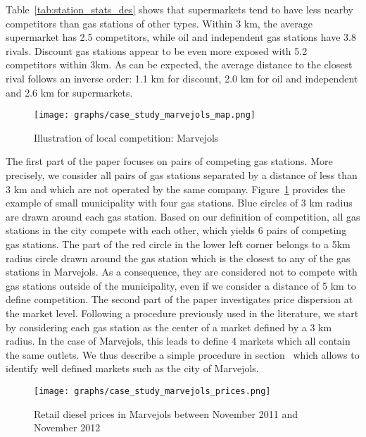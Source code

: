 \documentclass[english]{article}
\begin{document}
Table~\ref{tab:station_stats_des} shows that supermarkets tend to have less nearby competitors than gas stations of other types. Within 3 km, the average supermarket has 2.5 competitors, while oil and independent gas stations have 3.8 rivals. Discount gas stations appear to be even more exposed with 5.2 competitors within 3km. As can be expected, the average distance to the closest rival follows an inverse order: 1.1 km for discount, 2.0 km for oil and independent and 2.6 km for supermarkets.

\begin{figure}[htb!]
    \caption{Illustration of local competition: Marvejols}
	\centering
\texttt{[image: graphs/case\_study\_marvejols\_map.png]}
\label{fig:case_study_map}
\end{figure}

The first part of the paper focuses on pairs of competing gas stations. More precisely, we consider all pairs of gas stations separated by a distance of less than 3 km and which are not operated by the same company. Figure~\ref{fig:case_study_map} provides the example of small municipality with four gas stations. Blue circles of 3 km radius are drawn around each gas station. Based on our definition of competition, all gas stations in the city compete with each other, which yields 6 pairs of competing gas stations. The part of the red circle in the lower left corner belongs to a 5km radius circle drawn around the gas station which is the closest to any of the gas stations in Marvejols. As a consequence, they are considered not to compete with gas stations outside of the municipality, even if we consider a distance of 5 km to define competition. The second part of the paper investigates price dispersion at the market level. Following a procedure previously used in the literature, we start by considering each gas station as the center of a market defined by a 3 km radius. In the case of Marvejols, this leads to define 4 markets which all contain the same outlets. We thus describe a simple procedure in section~\label{sec:market_dispersion} which allows to identify well defined markets such as the city of Marvejols.

\begin{figure}%
    \caption{Retail diesel prices in Marvejols between November 2011 and November 2012}
	\centering
		\texttt{[image: graphs/case\_study\_marvejols\_prices.png]}
\label{fig:case_study_prices}
\end{figure}
\end{document}
